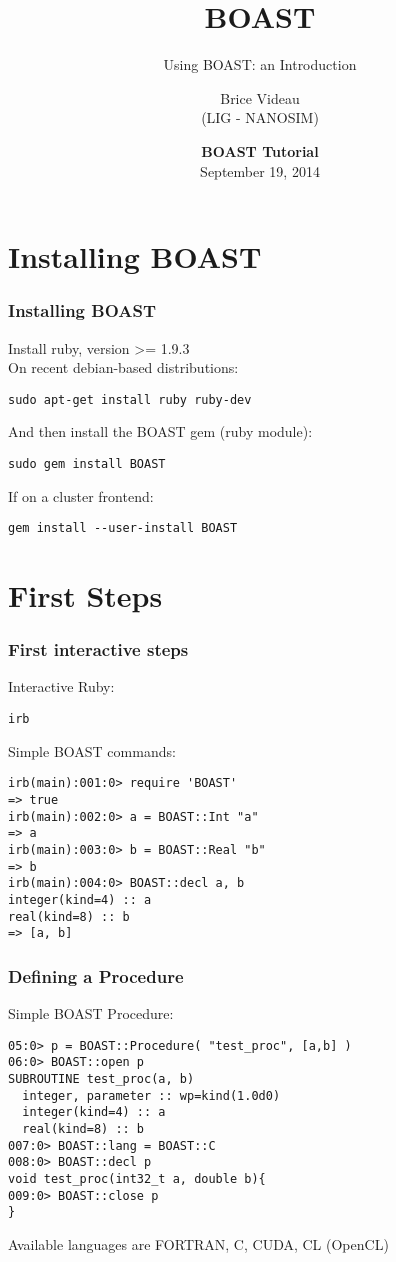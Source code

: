 \documentclass{beamer}
\title{BOAST}
\subtitle{Using BOAST: an Introduction }
\author{Brice Videau\\
(LIG - NANOSIM)}
\date{\textbf{BOAST Tutorial}\\September 19, 2014}
\begin{document}
\frame{\titlepage}

\section{Installing BOAST}


\begin{frame}[fragile]

    \frametitle{Installing BOAST}

Install ruby, version >= 1.9.3\\
On recent debian-based distributions:
\begin{lstlisting}
sudo apt-get install ruby ruby-dev
\end{lstlisting}
And then install the BOAST gem (ruby module):
\begin{lstlisting}
sudo gem install BOAST
\end{lstlisting}
If on a cluster frontend:
\begin{lstlisting}
gem install --user-install BOAST
\end{lstlisting}

\end{frame}

\section{First Steps}

\begin{frame}[fragile]
\frametitle{First interactive steps}
Interactive Ruby:
\begin{lstlisting}
irb
\end{lstlisting}
Simple BOAST commands:
\lstset{style=BOAST}
\begin{lstlisting}
irb(main):001:0> require 'BOAST'
=> true
irb(main):002:0> a = BOAST::Int "a"
=> a
irb(main):003:0> b = BOAST::Real "b"
=> b
irb(main):004:0> BOAST::decl a, b
integer(kind=4) :: a
real(kind=8) :: b
=> [a, b]
\end{lstlisting}
\end{frame}

\begin{frame}[fragile]
\frametitle{Defining a Procedure}
Simple BOAST Procedure:
\lstset{style=BOAST}
\footnotesize
\begin{lstlisting}
05:0> p = BOAST::Procedure( "test_proc", [a,b] )
06:0> BOAST::open p
SUBROUTINE test_proc(a, b)
  integer, parameter :: wp=kind(1.0d0)
  integer(kind=4) :: a
  real(kind=8) :: b
007:0> BOAST::lang = BOAST::C
008:0> BOAST::decl p
void test_proc(int32_t a, double b){
009:0> BOAST::close p
}
\end{lstlisting}
Available languages are FORTRAN, C, CUDA, CL (OpenCL)
\end{frame}
\end{document}
